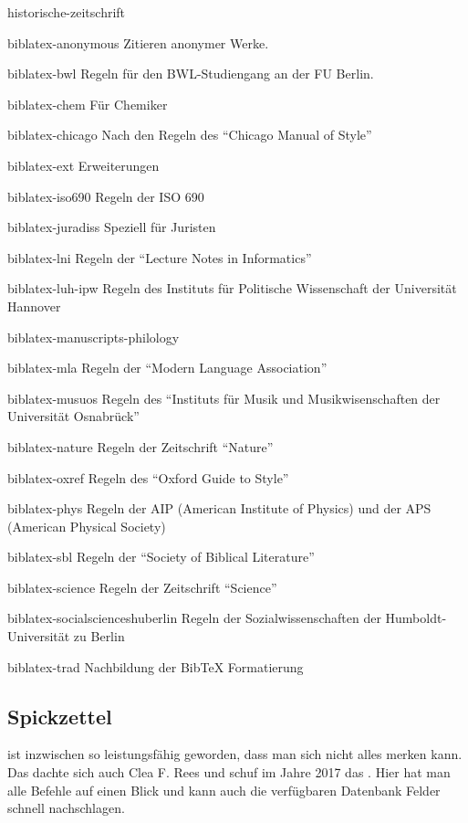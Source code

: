 \begin{labeling}{historische-zeitschrift}
\item[biblatex-anonymous] Zitieren anonymer Werke.
\item[biblatex-bwl]       Regeln für den BWL-Studiengang an der FU Berlin.
\item[biblatex-chem]      Für Chemiker
\item[biblatex-chicago]   Nach den Regeln des \enquote{Chicago Manual of
  Style}
\item[biblatex-ext]       \biblatex{} Erweiterungen
\item[biblatex-iso690]    Regeln der ISO 690
\item[biblatex-juradiss]  Speziell für Juristen
\item[biblatex-lni]       Regeln der \enquote{Lecture Notes in Informatics}
\item[biblatex-luh-ipw]   Regeln des Instituts für Politische Wissenschaft der Universität Hannover
\item[biblatex-manuscripts-philology]
\item[biblatex-mla]       Regeln der \enquote{Modern Language Association}
\item[biblatex-musuos]    Regeln des \enquote{Instituts für Musik und
  Musikwisenschaften der Universität Osnabrück}
\item[biblatex-nature]    Regeln der Zeitschrift \enquote{Nature}
\item[biblatex-oxref]     Regeln des \enquote{Oxford Guide to Style}
\item[biblatex-phys]      Regeln der AIP (American Institute of Physics) und der APS (American Physical Society)
\item[biblatex-sbl]       Regeln der \enquote{Society of Biblical Literature}
\item[biblatex-science]   Regeln der Zeitschrift \enquote{Science}
\item[biblatex-socialscienceshuberlin] Regeln der Sozialwissenschaften der Humboldt-Universität zu Berlin
\item[biblatex-trad]      Nachbildung der BibTeX Formatierung
\end{labeling}

\subsection{Spickzettel}

\biblatex{} ist inzwischen so leistungsfähig geworden, dass man sich nicht alles merken kann.
Das dachte sich auch Clea F. Rees und schuf im Jahre 2017 das .
Hier hat man alle  Befehle auf einen Blick und kann auch die verfügbaren Datenbank Felder schnell nachschlagen.

